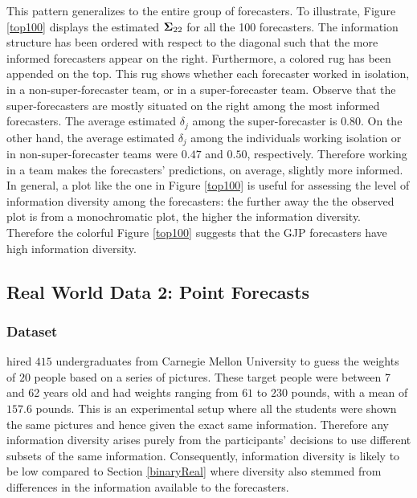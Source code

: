 \documentclass[11pt]{article}
\theoremstyle{definition}
\theoremstyle{definition}
\def\bSigma{{\bf \Sigma}}
\begin{document}
This pattern generalizes to the entire group of forecasters. To illustrate, Figure  \ref{top100} displays the estimated $\bSigma_{22}$ for all the 100 forecasters. The information structure has been ordered with respect to the diagonal such that the more informed forecasters appear on the right. Furthermore, a colored rug has been appended on the top. This rug shows whether each forecaster worked in isolation, in a non-super-forecaster team, or in a super-forecaster team. Observe that the super-forecasters are mostly situated on the right among the most informed forecasters. The average estimated $\delta_j$ among the super-forecaster is $0.80$.  On the other hand, the average estimated $\delta_j$ among the individuals working isolation or in non-super-forecaster teams were $0.47$ and $0.50$, respectively. Therefore working in a team makes the forecasters' predictions, on average, slightly more informed. In general, a plot like the one in Figure  \ref{top100} is useful for assessing the level of information diversity among the forecasters: the further away the the observed plot is from a monochromatic plot, the higher the information diversity. Therefore the colorful Figure  \ref{top100} suggests that the GJP forecasters have high information diversity. 




\subsection{Real World Data 2: Point Forecasts}
\label{continuousReal}
\subsubsection{Dataset}
\citet{moore2008use} hired $415$ undergraduates from Carnegie Mellon University to guess the weights of $20$ people based on a series of pictures. These target people were between 7 and 62 years old and had weights ranging from $61$ to $230$ pounds, with a mean of $157.6$ pounds. This is an experimental setup where all the students were shown the same pictures and hence given the exact same information. 
Therefore any information diversity arises purely from the participants' decisions to use different subsets of the same information. 
Consequently, information diversity is likely to be low compared to Section \ref{binaryReal} where diversity also stemmed from differences in the information available to the forecasters.
\end{document}
